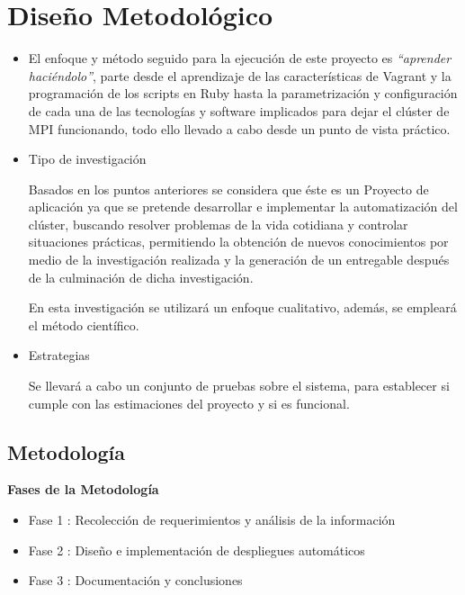 \documentclass[letterpaper, 12pt, oneside]{article}
\begin{document}
    \section{Diseño Metodológico}
     \begin{itemize}
        \item 

  El enfoque y método seguido para la ejecución de este proyecto es \textit{“aprender haciéndolo”}, parte desde el aprendizaje de las características de Vagrant y la programación de los scripts en Ruby hasta la parametrización y configuración de cada una de las tecnologías y software implicados para dejar el clúster de MPI funcionando, todo ello llevado a cabo desde un punto de vista práctico.

  
        \item Tipo de investigación
        
        Basados en los puntos anteriores se considera que éste es un Proyecto de aplicación ya que se pretende desarrollar e implementar la automatización del clúster, buscando resolver problemas de la vida cotidiana y controlar situaciones prácticas, permitiendo la obtención de nuevos conocimientos por medio de la investigación realizada y la generación de un entregable después de la culminación de dicha investigación. 
    
        En esta investigación se utilizará un enfoque cualitativo, además, se empleará el método científico.
        
        \item Estrategias
        
        Se llevará a cabo un conjunto de pruebas sobre el sistema, para establecer si cumple con las estimaciones del proyecto y si es funcional.
     \end{itemize}
    \newpage
    \subsection{Metodología}
    \textbf{Fases de la Metodología}
    \begin{itemize}
        \item Fase 1 : Recolección de requerimientos y análisis de la información
        \item Fase 2 : Diseño e implementación de despliegues automáticos
        \item Fase 3 : Documentación y conclusiones
    \end{itemize}\\
       \clearpage
    
\end{document}
